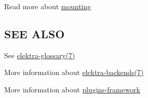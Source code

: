Read more about \hyperlink{doc_help_elektra-mounting_md}{mounting}

\subsection*{S\+EE A\+L\+SO}


\begin{DoxyItemize}
\item See \hyperlink{doc_help_elektra-glossary_md}{elektra-\/glossary(7)}
\item More information about \hyperlink{doc_help_elektra-backends_md}{elektra-\/backends(7)}
\item More information about \hyperlink{doc_dev_plugins-framework_md}{plugins-\/framework} 
\end{DoxyItemize}